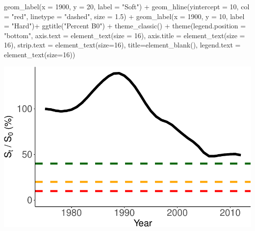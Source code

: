 \documentclass[
]{book}
\newenvironment{Shaded}{\begin{snugshade}}{\end{snugshade}}
\newcommand{\AttributeTok}[1]{\textcolor[rgb]{0.77,0.63,0.00}{#1}}
\newcommand{\DecValTok}[1]{\textcolor[rgb]{0.00,0.00,0.81}{#1}}
\newcommand{\FloatTok}[1]{\textcolor[rgb]{0.00,0.00,0.81}{#1}}
\newcommand{\FunctionTok}[1]{\textcolor[rgb]{0.00,0.00,0.00}{#1}}
\newcommand{\NormalTok}[1]{#1}
\newcommand{\SpecialCharTok}[1]{\textcolor[rgb]{0.00,0.00,0.00}{#1}}
\newcommand{\StringTok}[1]{\textcolor[rgb]{0.31,0.60,0.02}{#1}}
\begin{document}
\begin{Shaded}
\begin{Highlighting}[]
  \FunctionTok{geom\_label}\NormalTok{(}\AttributeTok{x =} \DecValTok{1900}\NormalTok{, }\AttributeTok{y =} \DecValTok{20}\NormalTok{, }\AttributeTok{label =} \StringTok{"Soft"}\NormalTok{) }\SpecialCharTok{+}
  \FunctionTok{geom\_hline}\NormalTok{(}\AttributeTok{yintercept =} \DecValTok{10}\NormalTok{, }\AttributeTok{col =} \StringTok{"red"}\NormalTok{, }\AttributeTok{linetype =} \StringTok{"dashed"}\NormalTok{, }\AttributeTok{size =} \FloatTok{1.5}\NormalTok{) }\SpecialCharTok{+}
  \FunctionTok{geom\_label}\NormalTok{(}\AttributeTok{x =} \DecValTok{1900}\NormalTok{, }\AttributeTok{y =} \DecValTok{10}\NormalTok{, }\AttributeTok{label =} \StringTok{"Hard"}\NormalTok{)}\SpecialCharTok{+}
  \FunctionTok{ggtitle}\NormalTok{(}\StringTok{"Percent B0"}\NormalTok{) }\SpecialCharTok{+}
  \FunctionTok{theme\_classic}\NormalTok{() }\SpecialCharTok{+}
  \FunctionTok{theme}\NormalTok{(}\AttributeTok{legend.position =} \StringTok{"bottom"}\NormalTok{, }
        \AttributeTok{axis.text =} \FunctionTok{element\_text}\NormalTok{(}\AttributeTok{size =} \DecValTok{16}\NormalTok{), }
        \AttributeTok{axis.title =} \FunctionTok{element\_text}\NormalTok{(}\AttributeTok{size =} \DecValTok{16}\NormalTok{),}
        \AttributeTok{strip.text =} \FunctionTok{element\_text}\NormalTok{(}\AttributeTok{size=}\DecValTok{16}\NormalTok{),}
        \AttributeTok{title=}\FunctionTok{element\_blank}\NormalTok{(),}
        \AttributeTok{legend.text =} \FunctionTok{element\_text}\NormalTok{(}\AttributeTok{size=}\DecValTok{16}\NormalTok{))}
\end{Highlighting}
\end{Shaded}

\includegraphics{_main_files/figure-latex/ssbs-1.pdf}
\end{document}
